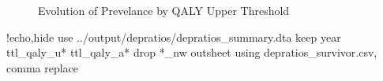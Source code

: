\documentclass{article}
\begin{document}
\begin{figure}[ht]
\centering
{}
\caption{Evolution of Prevelance by QALY Upper Threshold}
\end{figure}

\begin{Statacode}{!echo,hide}
use ../output/depratios/depratios_summary.dta
keep year ttl_qaly_u* ttl_qaly_a*
drop *_nw
outsheet using depratios_survivor.csv, comma replace
\end{Statacode}
\end{document}
